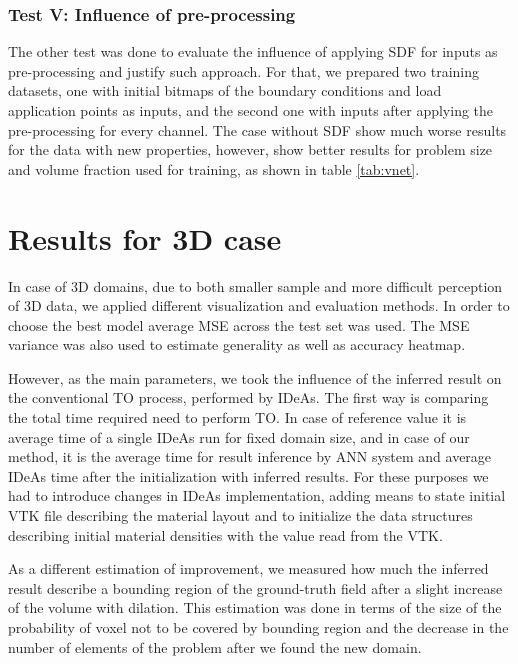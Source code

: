 \subsubsection{Test V: Influence of pre-processing}
The other test was done to evaluate the influence of applying SDF for inputs as pre-processing and justify such approach.
For that, we prepared two training datasets, one with initial bitmaps of the boundary conditions and load application points as inputs, and the second one with inputs after applying the pre-processing for every channel.
The case without SDF show much worse results for the data with new properties, however, show better results for problem size and volume fraction used for training, as shown in table \ref{tab:vnet}.
\medskip

\section{Results for 3D case}

In case of 3D domains, due to both smaller sample and more difficult perception of 3D data, we applied different visualization and evaluation methods.
In order to choose the best model average MSE across the test set was used.
The MSE variance was also used to estimate generality as well as accuracy heatmap.
\medskip 

However, as the main parameters, we took the influence of the inferred result on the conventional TO process, performed by IDeAs.
The first way is comparing the total time required need to perform TO. 
In case of reference value it is average time of a single IDeAs run for fixed domain size, and in case of our method, it is the average time for result inference by ANN system and average IDeAs time after the initialization with inferred results. For these purposes we had to introduce changes in IDeAs implementation, adding means to state initial VTK file describing the material layout and to initialize the data structures describing initial material densities with the value read from the VTK.
\medskip
{}

As a different estimation of improvement, we measured how much the inferred result describe a bounding region of the ground-truth field after a slight increase of the volume with dilation.
This estimation was done in terms of the size of the probability of voxel not to be covered by bounding region and the decrease in the number of elements of the problem after we found the new domain. 

